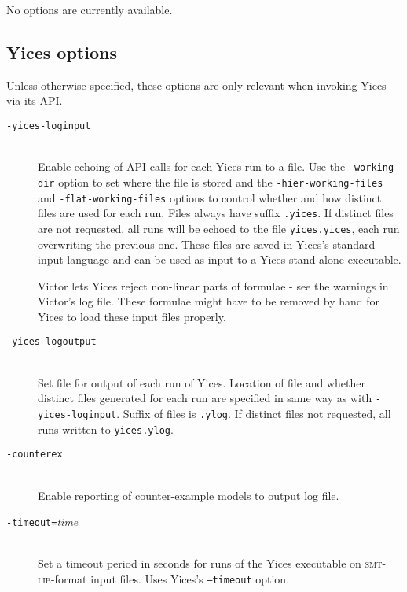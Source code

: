 \documentclass[12pt,fleqn]{article}
\newcommand{\fixme}[1]{\textbf{FIXME: {#1}}}
\newcommand{\yices}{Yices}
\newcommand{\smtlib}{\textsc{smt-lib}}
\newcommand{\optionb}[1]{\item[\texttt{-{#1}}]\ \\}
\newcommand{\optionv}[2]{\item[\texttt{-{#1}=}\mdseries\textit{#2}]\ \\}
\begin{document}
No options are currently available.

\subsection{Yices options}

Unless otherwise specified, these options are only relevant when invoking
\yices{} via its API.

\begin{description}
\optionb{yices-loginput}
  Enable echoing of API calls for each \yices{} run to a file. 
  Use the \texttt{-working-dir} option to set where the file is stored
  and the 
  \texttt{-hier-working-files} and \texttt{-flat-working-files} options
  to control whether and how distinct files are used for each run. 
  Files always have suffix \texttt{.yices}.  If distinct files are not
  requested, all runs will be echoed to the file 
  \texttt{yices.yices}, each run overwriting the previous one.
  These files are saved in \yices{}'s standard input language and can be 
  used as input to a \yices{} stand-alone executable.
\begin{remark}
  Victor lets \yices{} reject non-linear parts of formulae - see the
  warnings in Victor's log file.  These formulae might have to be removed by 
  hand for \yices{} to load these input files properly.
\end{remark}


\optionb{yices-logoutput}
  Set file for output of each run of \yices{}. 
  Location of file and whether distinct files generated for each run
  are specified in same way as with \texttt{-yices-loginput}.
  Suffix of files is \texttt{.ylog}.  If distinct files not requested,
  all runs written to \texttt{yices.ylog}.


\optionb{counterex} 
   Enable reporting of counter-example models to output log file.



\optionv{timeout}{time}
  Set a timeout period in seconds for runs of the \yices{} executable 
  on \smtlib{}-format input files.   Uses \yices{}'s \texttt{--timeout}
  option.

\end{description}
\end{document}
